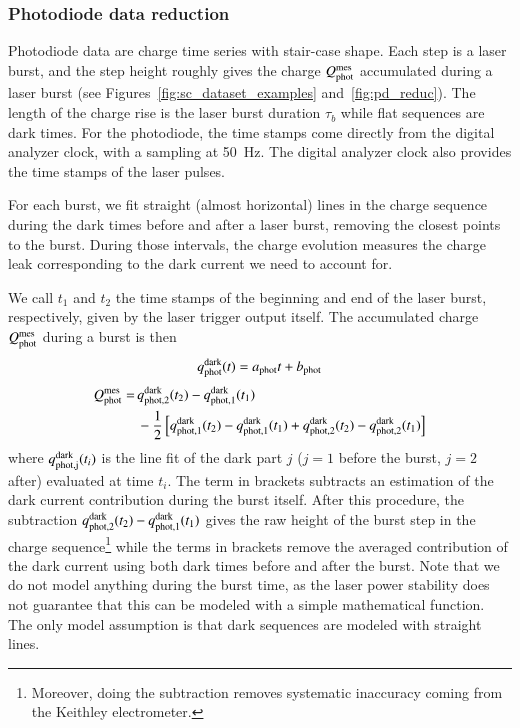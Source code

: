 \subsubsection{Photodiode data reduction}
\label{sec:pd_reduction}

Photodiode data are charge time series with stair-case shape. Each step is a laser burst, and the step height roughly gives the charge $Q_{\mathrm{phot}}^{\mathrm{mes}}$ accumulated during a laser burst (see Figures~\ref{fig:sc_dataset_examples} and~\ref{fig:pd_reduc}). The length of the charge rise is the laser burst duration $\tau_b$ while flat sequences are dark times. For the photodiode, the time stamps come directly from the digital analyzer clock, with a sampling at \SI{50}{\hertz}. The digital analyzer clock also provides the time stamps of the laser pulses. 

For each burst, we fit straight (almost horizontal) lines in the charge sequence during the dark times before and after a laser burst, removing the closest points to the burst. During those intervals, the charge evolution measures the charge leak corresponding to the dark current we need to account for.

We call $t_1$ and $t_2$ the time stamps of the beginning and end of the laser burst, respectively, given by the laser trigger output itself. 
The accumulated charge $Q_{\mathrm{phot}}^{\mathrm{mes}}$ during a burst is then
\begin{equation}
q_{\rm phot}^{\rm dark}(t) = a_{\rm phot} t + b_{\rm phot}
\end{equation}
\begin{align}
Q_{\mathrm{phot}}^{\mathrm{mes}} = \, &q_{\rm phot,2}^{\rm dark}(t_2) - q_{\rm phot,1}^{\rm dark}(t_1)\\ & - \frac{1}{2} \left[ q_{\rm phot,1}^{\rm dark}(t_2) -  q_{\rm phot,1}^{\rm dark}(t_1) + q_{\rm phot,2}^{\rm dark}(t_2) - q_{\rm phot,2}^{\rm dark}(t_1)  \right]   \notag 
\end{align}
where $q_{\rm phot,j}^{\rm dark}(t_i)$ is the line fit of the dark part $j$ ($j=1$ before the burst, $j=2$ after) evaluated at time $t_i$. The term in brackets subtracts an estimation of the dark current contribution during the burst itself. After this procedure, the subtraction $q_{\rm phot,2}^{\rm dark}(t_2) - q_{\rm phot,1}^{\rm dark}(t_1)$ gives the raw height of the burst step in the charge sequence\footnote{Moreover, doing the subtraction removes systematic inaccuracy coming from the Keithley electrometer.} while the terms in brackets remove the averaged contribution of the dark current using both dark times before and after the burst. Note that we do not model anything during the burst time, as the laser power stability does not guarantee that this can be modeled with a simple mathematical function. The only model assumption is that dark sequences are modeled with straight lines.

